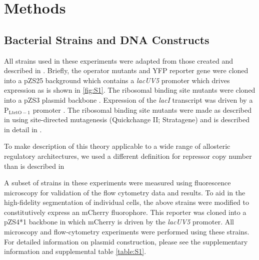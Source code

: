 \section*{Methods }


\subsection*{Bacterial Strains and DNA Constructs}
All strains used in these experiments were adapted from those created and
described in \cite{Garcia2011} . Briefly, the operator mutants and YFP reporter
gene were cloned into a pZS25 background which contains a \textit{lacUV5}
promoter which drives expression as is shown in \ref{fig:S1}. The ribosomal
binding site mutants were cloned into a pZS3 plasmid backbone  . Expression of
the \textit{lacI} transcript was driven by a P$_\mathrm{LtetO-1}$ promoter
\cite{Lutz1997}. The ribosomal binding site mutants were made as described in
\cite{Salis2009} using site-directed mutagenesis (Quickchange II; Stratagene)
and is described in detail in \cite{Garcia2011}.

To make description of this theory applicable to a wide range of allosteric
regulatory architectures, we used a different definition for repressor copy
number than is described in \cite{}


A subset of strains in these experiments were measured using fluorescence
microscopy for validation of the flow cytometry data and results. To aid in the
high-fidelity segmentation of individual cells, the above strains were
modified to constitutively express an mCherry fluorophore. This reporter was
cloned into a pZS4*1 backbone in which mCherry is driven by the \textit{lacUV5} promoter.
All microscopy and flow-cytometry experiments were performed using these
strains. For detailed information on plasmid construction, please see the
supplementary information and supplemental table \ref{table:S1}.




